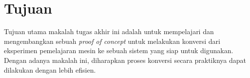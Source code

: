 \section{Tujuan}

Tujuan utama makalah tugas akhir ini adalah untuk mempelajari dan mengembangkan sebuah \textit{proof of concept} untuk melakukan konversi dari eksperimen pemelajaran mesin ke sebuah sistem yang siap untuk digunakan.
Dengan adanya makalah ini, diharapkan proses konversi secara praktiknya dapat dilakukan dengan lebih efisien.
